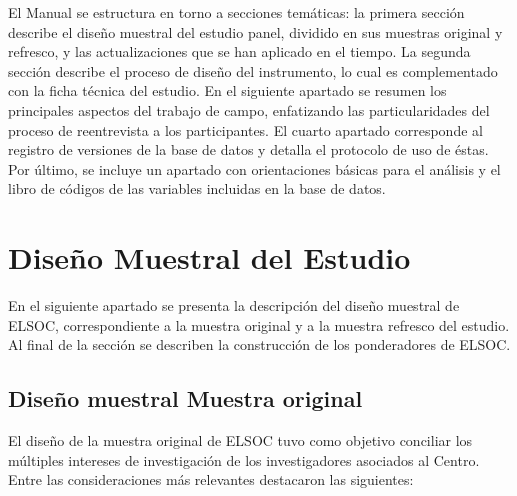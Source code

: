 \documentclass[
  12pt,
]{article}
\begin{document}
El Manual se estructura en torno a secciones temáticas: la primera sección describe el diseño muestral del estudio panel, dividido en sus muestras original y refresco, y las actualizaciones que se han aplicado en el tiempo. La segunda sección describe el proceso de diseño del instrumento, lo cual es complementado con la ficha técnica del estudio. En el siguiente apartado se resumen los principales aspectos del trabajo de campo, enfatizando las particularidades del proceso de reentrevista a los participantes. El cuarto apartado corresponde al registro de versiones de la base de datos y detalla el protocolo de uso de éstas. Por último, se incluye un apartado con orientaciones básicas para el análisis y el libro de códigos de las variables incluidas en la base de datos.

\newpage

\hypertarget{dis_muest}{%
\section{Diseño Muestral del Estudio}\label{dis_muest}}

En el siguiente apartado se presenta la descripción del diseño muestral de ELSOC, correspondiente a la muestra original y a la muestra refresco del estudio. Al final de la sección se describen la construcción de los ponderadores de ELSOC.

\hypertarget{dis_muest_original}{%
\subsection{Diseño muestral Muestra original}\label{dis_muest_original}}

El diseño de la muestra original de ELSOC tuvo como objetivo conciliar los múltiples intereses de investigación de los investigadores asociados al Centro. Entre las consideraciones más relevantes destacaron las siguientes:
\end{document}
